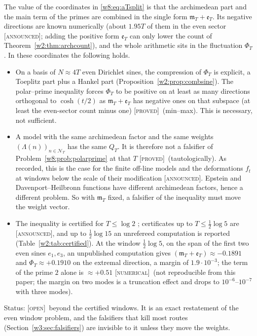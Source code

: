 \documentclass[11pt]{amsart}
\theoremstyle{definition}
\theoremstyle{remark}
\numberwithin{equation}{section}
\newcommand{\NT}{\mathcal{N}_T}                        %
\newcommand{\mT}{\mathfrak{m}_T}                       %
\newcommand{\stag}[1]{\textsc{[#1]}}
\newcommand{\PROVED}{\stag{proved}}
\newcommand{\NUM}{\stag{numerical}}
\newcommand{\OPENQ}{\stag{open}}
\newcommand{\ANNOUNCED}{\stag{announced}}
\begin{document}
The value of the coordinates in \eqref{w8:eq:aTsplit} is that the archimedean part and the main term of the primes
are combined in the single form $\mT+\mathfrak e_T$. Its negative directions are known numerically (about $1.95T$ of
them in the even sector \ANNOUNCED; adding the positive form $\mathfrak e_T$ can only lower the count of
Theorem~\ref{w2:thm:archcount}),
and the whole arithmetic sits in the fluctuation $\Phi_T$. In these coordinates the following holds.
\begin{itemize}
\item On a basis of $N\approx4T$ even Dirichlet sines, the compression of $\Phi_T$ is explicit, a Toeplitz part plus a
  Hankel part (Proposition~\ref{w2:prop:combsine}). The polar--prime inequality forces $\Phi_T$ to be positive on at
  least as many directions orthogonal to $\cosh(t/2)$ as $\mT+\mathfrak e_T$ has negative ones on that subspace (at least the even-sector count minus one) \PROVED\ (min--max).
  This is necessary, not sufficient.
\item A model with the same archimedean factor and the same weights $(\Lambda(n))_{n\in\NT}$ has the same $Q_T$. It is
  therefore not a falsifier of Problem~\ref{w8:prob:polarprime} at that $T$ \PROVED\ (tautologically). As recorded,
  this is the case for the finite off-line models and the deformations $f_t$ at windows below the scale of their
  modification \ANNOUNCED. Epstein and Davenport--Heilbronn functions have different
  archimedean factors, hence a different problem. So with $\mT$ fixed, a falsifier of the inequality must move the
  weight vector.
\item The inequality is certified for $T\le\log2$ \cite[Theorem~9.18 and Corollary~9.20]{P42}; certificates up to $T\le\frac12\log5$ are
  \ANNOUNCED, and up to $\frac12\log15$ an unrefereed computation \cite{Mori15} is reported
  (Table~\ref{w2:tab:certified}). At the window $\frac12\log5$, on the span of the first two even sines $e_1,e_3$, an
  unpublished computation gives $(\mT+\mathfrak e_T)\approx-0.1891$ and $\Phi_T\approx+0.1910$ on the extremal direction,
  a margin of $1.9\cdot10^{-3}$; the term of the prime $2$ alone is $\approx+0.51$ \NUM\ (not reproducible from this
  paper; the margin on two modes is a truncation effect and drops to $10^{-6}$--$10^{-7}$ with three modes).
\end{itemize}
Status: \OPENQ\ beyond the certified windows. It is an exact restatement of the even window problem, and the falsifiers
that kill most routes (Section~\ref{w3:sec:falsifiers}) are invisible to it unless they move the weights.
\end{document}
